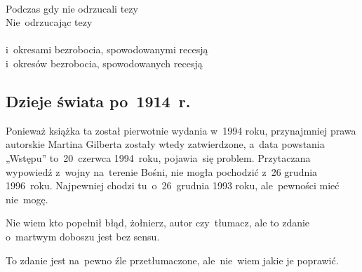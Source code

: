 \documentclass[a4paper,11pt]{article}
\begin{document}
\noindent
{} \\
\Jest  Podczas gdy nie odrzucali tezy \\
\Powin Nie~odrzucając tezy \\
 \\
\Jest  i~okresami bezrobocia, spowodowanymi recesją \\
\Powin i~okresów bezrobocia, spowodowanych recesją \\

\vspace{\spaceTwo}










\subsection{Dzieje świata po~1914~r.}

\vspace{\spaceThree}







\start {} Ponieważ książka ta został pierwotnie wydania
w~1994 roku, przynajmniej prawa autorskie Martina Gilberta zostały
wtedy zatwierdzone, a~data powstania „Wstępu” to~20~czerwca 1994~roku,
pojawia~się problem. Przytaczana wypowiedź z~wojny na~terenie Bośni,
nie mogła pochodzić z~26 grudnia 1996~roku. Najpewniej chodzi
tu~o~26~grudnia 1993 roku, ale~pewności mieć nie~mogę.

\vspace{\spaceFour}



\start {} Nie wiem kto popełnił błąd, żołnierz, autor
czy~tłumacz, ale to zdanie o~martwym doboszu jest bez sensu.

\vspace{\spaceFour}



\start {} To zdanie jest na~pewno źle przetłumaczone,
ale~nie~wiem jakie je poprawić.
\end{document}
